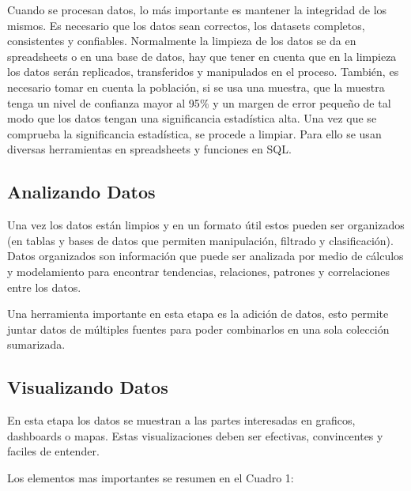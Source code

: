 \documentclass[12pt,a4paper,openright]{article}
\begin{document}
Cuando se procesan datos, lo m\'as importante es mantener la integridad de los mismos. Es necesario que los datos sean correctos, los datasets completos, consistentes y confiables. Normalmente la limpieza de los datos se da en spreadsheets o en una base de datos, hay que tener en cuenta que en la limpieza los datos serán replicados, transferidos y manipulados en el proceso. También, es necesario tomar en cuenta la población, si se usa una muestra, que la muestra tenga un nivel de confianza mayor al 95$\%$ y un margen de error pequeño de tal modo que los datos tengan una significancia estadística alta. Una vez que se comprueba la significancia estadística, se procede a limpiar. Para ello se usan diversas herramientas en spreadsheets y funciones en SQL.

\subsection{Analizando Datos}
Una vez los datos están limpios y en un formato útil estos pueden ser organizados (en tablas y bases de datos que permiten manipulación, filtrado y clasificación). Datos organizados son información que puede ser analizada por medio de cálculos y modelamiento para encontrar tendencias, relaciones, patrones y correlaciones entre los datos.

Una herramienta importante en esta etapa es la adición de datos, esto permite juntar datos de múltiples fuentes para poder combinarlos en una sola colección sumarizada.

\subsection{Visualizando Datos}
En esta etapa los datos se muestran a las partes interesadas en graficos, dashboards o mapas. Estas visualizaciones deben ser efectivas, convincentes y faciles de entender.

Los elementos mas importantes se resumen en el Cuadro 1:
\end{document}
